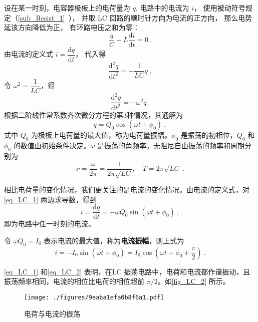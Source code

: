 设在某一时刻，电容器极板上的电荷量为 $q$, 电路中的电流为 $i$， 使用被动符号规定（\autoref{sub_Resist_1}~）， 并取 LC 回路的顺时针方向为电流的正方向， 那么电势延该方向降低为正， 有环路电压之和为零：
\begin{equation}
\frac{q}{C} + L \frac{\mathrm{d} i}{\mathrm{d} t} = 0~.
\end{equation}
由电流的定义式 $i=\dfrac{\mathrm{d} q}{\mathrm{d} t}$， 代入得
\begin{equation}
\frac{\mathrm{d}^{2} q}{\mathrm{d} t^{2}}=-\frac{1}{L C} q~,
\end{equation}
令 $\omega^{2}=\dfrac{1}{L C}$，得
\begin{equation}
\frac{\mathrm{d}^{2} q}{\mathrm{d} t^{2}}=-\omega^{2} q~.
\end{equation}
根据二阶线性常系数齐次微分方程的第3种情况，其通解为
\begin{equation} \label{eq_LC_1}
q=Q_{0} \cos \left(\omega t+\phi_{0}\right)~,
\end{equation}
式中 $Q_0$ 为极板上电荷量的最大值，称为电荷量振幅。$\phi_0$ 是振荡的初相位，$Q_0$ 和 $\phi_0$ 的数值由初始条件决定。$\omega$ 是振荡的角频率。无阻尼自由振荡的频率和周期分别为
\begin{equation}
\nu=\frac{\omega}{2 \pi}=\frac{1}{2 \pi \sqrt{L C}}, \quad T=2 \pi \sqrt{L C}~.
\end{equation}

相比电荷量的变化情况，我们更关注的是电流的变化情况。由电流的定义式，对\autoref{eq_LC_1} 两边求导数，得到
\begin{equation}
i=\frac{\mathrm{d} q}{\mathrm{d} t}=-\omega Q_{0} \sin \left(\omega t+\phi_{0}\right)~,
\end{equation}
即为电路中任一时刻的电流。

令 $\omega Q_0=I_0$ 表示电流的最大值，称为\textbf{电流振幅}，则上式为
\begin{equation} \label{eq_LC_2}
i=-I_{0} \sin \left(\omega t+\phi_{0}\right)=I_{0} \cos \left(\omega t+\phi_{0}+\frac{\pi}{2}\right)~.
\end{equation}

\autoref{eq_LC_1} 和\autoref{eq_LC_2} 表明，在LC 振荡电路中，电荷和电流都作谐振动，且振荡频率相同，电流的相位比电荷的相位超前 $\pi/2$。如\autoref{fig_LC_2} 所示。

\begin{figure}[ht]
\centering
\texttt{[image: ./figures/9eaba1efa0b8f6a1.pdf]}
\caption{电荷与电流的振荡} \label{fig_LC_2}
\end{figure}

